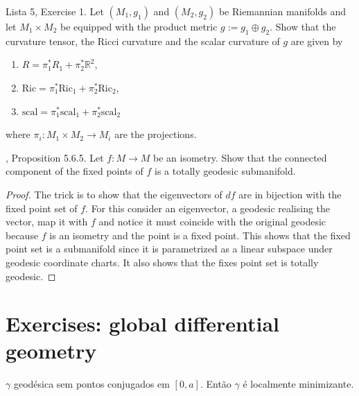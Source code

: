 \begin{exercise}
\label{exercise-curvatures-in-product}
Lista 5, Exercise 1. Let $(M_1,g_1)$ and $(M_2,g_2)$ be Riemannian manifolds and
let $M_1\times M_2$ be equipped with the product metric $g:=g_1\oplus g_2$. Show
that the curvature tensor, the Ricci curvature and the scalar curvature of $g$
are given by
\begin{enumerate}
\item $R=\pi_1^*R_1+\pi_2^*\mathbb{R}^2$,
\item $\text{Ric}=\pi_1^*\text{Ric}_1+\pi_2^*\text{Ric}_2$,
\item $\text{scal}=\pi_1^*\text{scal}_1+\pi_2^*\text{scal}_2$
\end{enumerate}
where $\pi_i:M_1\times M_2\to M_i$ are the projections.
\end{exercise}

\begin{exercise}
\label{exercise-fixed-point-set-of-isometry-is-totally-geodesic-submanifold}
\cite{pet}, Proposition 5.6.5. Let $f:M\to M$ be an isometry. Show that the
connected component of the fixed points of $f$ is a totally geodesic
submanifold.
\end{exercise}

\begin{proof}
The trick is to show that the eigenvectors of $df$ are in bijection with the
fixed point set of $f$. For this consider an eigenvector, a geodesic realising 
the vector, map it with $f$ and notice it must coincide with the original 
geodesic because $f$ is an isometry and the point is a fixed point. This shows
that the fixed point set is a submanifold since it is parametrized as a linear
subspace under geodesic coordinate charts. It also shows that the fixes point
set is totally geodesic.
\end{proof}

\section{Exercises: global differential geometry}
\label{section-exercises-global-differential-geometry}

\begin{exercise}
\label{exercise-geodesica-sem-pontos-conjugados-e-localmente-minimizante}
$\gamma$ geodésica sem pontos conjugados em $[0,a]$. Então $\gamma$ é localmente
minimizante.
\end{exercise}


